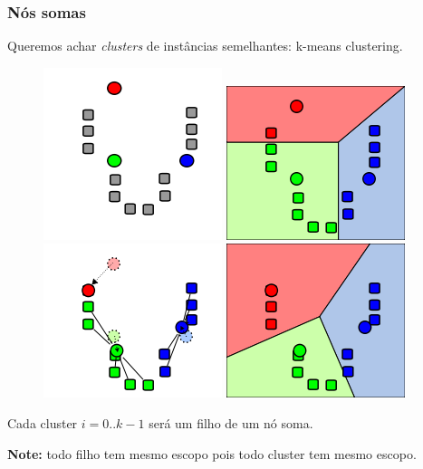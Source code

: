 \documentclass[10pt]{beamer}
\theoremstyle{plain}
\begin{document}
\begin{frame}
  \frametitle{Nós somas}
  Queremos achar \textit{clusters} de instâncias semelhantes: k-means clustering.

  \begin{figure}[h]
    \centering\includegraphics[scale=0.3]{imgs/kmeans0.png}
    \includegraphics[scale=0.3]{imgs/kmeans1.png}
    \includegraphics[scale=0.3]{imgs/kmeans2.png}
    \includegraphics[scale=0.3]{imgs/kmeans3.png}
  \end{figure}

  Cada cluster $i=0..k-1$ será um filho de um nó soma.

  \textbf{Note:} todo filho tem mesmo escopo pois todo cluster tem mesmo escopo.
\end{frame}
\end{document}
